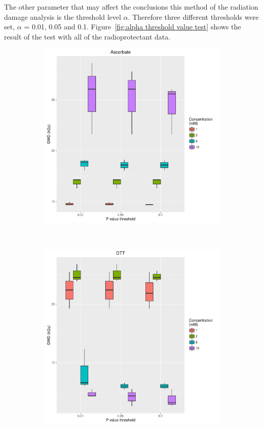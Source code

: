 The other parameter that may affect the conclusions this method of the radiation damage analysis is the threshold level $\alpha$. Therefore three different thresholds were set, $\alpha$ = 0.01, 0.05 and 0.1.
Figure~\ref{fig:alpha threshold value test} shows the result of the test with all of the radioprotectant data.
\begin{figure}
    \centering
    \begin{subfigure}[b]{0.75\textwidth}
            \centering
            \includegraphics[width=\textwidth]{figures/saxs/Ascorbate_PThresh_comp.pdf}
            \caption{}
            \label{}
    \end{subfigure}
    \\
    \begin{subfigure}[b]{0.75\textwidth}
            \centering
            \includegraphics[width=\textwidth]{figures/saxs/DTT_PThresh_comp.pdf}

\end{subfigure}
\end{figure}
